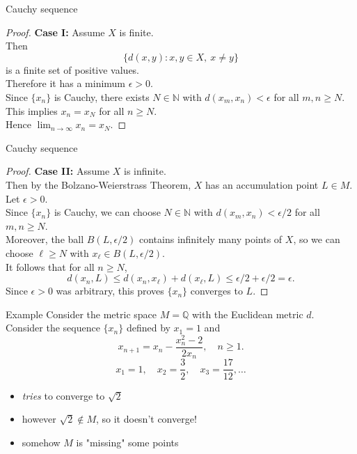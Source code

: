\documentclass{beamer}
\begin{document}
\begin{frame}{Cauchy sequence}
\begin{proof}
\textbf{Case I:} Assume $X$ is finite.\\
\pause
Then
$$\{d(x,y): x,y\in X,\ x\neq y\}$$
is a finite set of positive values.\\
\pause
Therefore it has a minimum $\epsilon > 0$.\\
\pause
Since $\{x_n\}$ is Cauchy, there exists $N\in\mathbb N$ with $d(x_m,x_n) < \epsilon$ for all $m,n \geq N$.\\
\pause
This implies $x_n = x_N$ for all $n\geq N$.\\
\pause
Hence $\lim_{n\rightarrow\infty} x_n = x_N$.
\end{proof}
\end{frame}

\begin{frame}{Cauchy sequence}
\begin{proof}
\textbf{Case II:} Assume $X$ is infinite.\\
\pause
Then by the Bolzano-Weierstrass Theorem, $X$ has an accumulation point $L\in M$.\\
\pause
Let $\epsilon > 0$.\\
\pause
Since $\{x_n\}$ is Cauchy, we can choose $N\in\mathbb N$ with $d(x_m,x_n) < \epsilon/2$ for all $m,n\geq N$.\\
\pause
Moreover, the ball $B(L,\epsilon /2)$ contains infinitely many points of $X$, so we can choose $\ell\geq N$ with $x_\ell\in B(L,\epsilon/2)$.\\
\pause
It follows that for all $n\geq N$,
$$d(x_n,L)\leq d(x_n,x_\ell) + d(x_\ell,L) \leq \epsilon/2 + \epsilon/2 = \epsilon.$$
\pause
Since $\epsilon > 0$ was arbitrary, this proves $\{x_n\}$ converges to $L$.
\end{proof}
\end{frame}

\begin{frame}{Example}
Consider the metric space $M=\mathbb{Q}$ with the Euclidean metric $d$.\\
\pause
Consider the sequence $\{x_n\}$ defined by $x_1 = 1$ and
$$x_{n+1} = x_n - \frac{x_n^2-2}{2x_n},\quad n\geq 1.$$
\pause
$$x_1 = 1,\quad x_2 = \frac{3}{2},\quad x_3 = \frac{17}{12},\dots$$
\begin{itemize}
\pause
\item \emph{tries} to converge to $\sqrt{2}$
\pause
\item however $\sqrt{2}\notin M$, so it doesn't converge!
\pause
\item somehow $M$ is "missing" some points
\end{itemize}
\end{frame}
\end{document}
